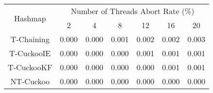 \begin{tabular}{|c|c|c|c|c|c|c|}
\hline
\multirow{2}{*}{Hashmap} & \multicolumn{6}{c|}{Number of Threads Abort Rate (\%)}\\\cline{2-7}& 2 & 4 & 8 & 12 & 16 & 20\\
\hline
\hline
T-Chaining & 0.000 & 0.000 & 0.001 & 0.002 & 0.002 & 0.003\\
T-CuckooIE & 0.000 & 0.000 & 0.000 & 0.001 & 0.001 & 0.001\\
T-CuckooKF & 0.000 & 0.000 & 0.000 & 0.000 & 0.001 & 0.001\\
NT-Cuckoo & 0.000 & 0.000 & 0.000 & 0.000 & 0.000 & 0.000\\
\hline
\end{tabular}
